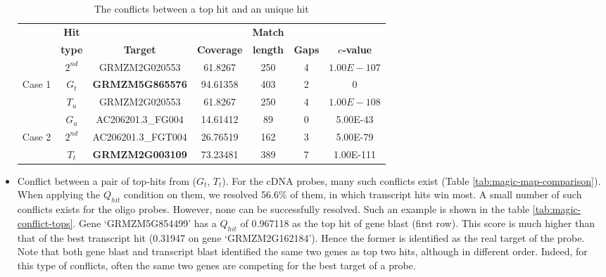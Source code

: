 \begin{itemize}
\begin{table}[b]
	\centering
	\begin{footnotesize}
	\caption{The conflicts between a top hit and an unique hit} 
	\label{tab:magic-conflict-topuniq}
	\begin{tabular}{@{}c|cccccc@{}}
	\toprule
	& \textbf{Hit} & & & \textbf{Match} & & \\
	& \textbf{type} & \textbf{Target} & \textbf{Coverage} & \textbf{length} 
	& \textbf{Gaps} & \textbf{$e$-value} \\ 
	\midrule
	& $2^{nd}$  & GRMZM2G020553 & 61.8267 & 250 & 4 & $1.00E-107$ \\ 
	Case 1 & \textbf{$G_t$} & \textbf{GRMZM5G865576} & 94.61358 & 403 & 2 & 0 
	\\ 
	& $T_u$ & GRMZM2G020553 & 61.8267 & 250 & 4 & $1.00E-108$ \\

 	\hline
 	
	& $G_u$ & AC206201.3\_FG004 & 14.61412 & 89 & 0 & 5.00E-43 \\
	Case 2 & $2^{nd}$ & AC206201.3\_FGT004 & 26.76519 & 162 & 3 & 5.00E-79 
	\\
	& $T_t$ & \textbf{GRMZM2G003109} & 73.23481 & 389 & 7 & 1.00E-111 \\
	\bottomrule
	\end{tabular}
	\end{footnotesize}
\end{table}

\item Conflict between a pair of top-hits from ($G_t$, $T_t$). 
For the cDNA probes, many such conflicts exist (Table 
\ref{tab:magic-map-comparison}). When applying the $Q_{hit}$ condition on them, 
we resolved 56.6\% of them, in which transcript hits win most.  
A small number of such conflicts exists for the oligo probes. However, none can 
be successfully resolved.
Such an example is shown in the table \ref{tab:magic-conflict-tops}. Gene  
‘GRMZM5G854499’ has a $Q_{hit}$ of 0.967118 as the top hit of gene blast (first 
row).  This score is much higher than that of the best transcript hit (0.31947 
on gene ‘GRMZM2G162184’).  Hence the former is identified as the real target of 
the probe. 
Note that both gene blast and transcript blast identified the same two genes as 
top two hits, although in different order.
Indeed, for this type of conflicts, often the same two genes are competing for 
the best target of a probe. 

\end{itemize}

